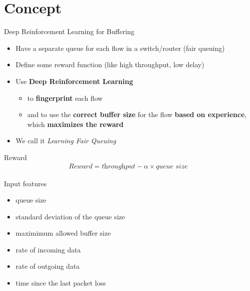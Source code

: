 \documentclass[xcolor={dvipsnames}]{beamer}
\begin{document}
\section{Concept}

\begin{frame}{Deep Reinforcement Learning for Buffering}
\begin{itemize}
\item Have a separate queue for each flow in a switch/router (fair queuing)
\item Define some reward function (like high throughput, low delay)
\item Use \textbf{Deep Reinforcement Learning}
\begin{itemize} \item to \textbf{fingerprint} each flow
\item and to use the \textbf{correct buffer size} for the flow \textbf{based on experience}, which \textbf{maximizes the reward}
\end{itemize}
\item We call it \textit{Learning Fair Queuing}
\end{itemize}
\end{frame}

\begin{frame}{Reward}
\begin{align*}
\textit{Reward} = \textit{throughput}-\alpha\times\textit{queue size}
\end{align*}
\end{frame}

\begin{frame}{Input features}
\begin{itemize}
\item queue size
\item standard deviation of the queue size 
\item maximimum allowed buffer size
\item rate of incoming data
\item rate of outgoing data
\item time since the last packet loss
\end{itemize}
\end{frame}

\end{document}
